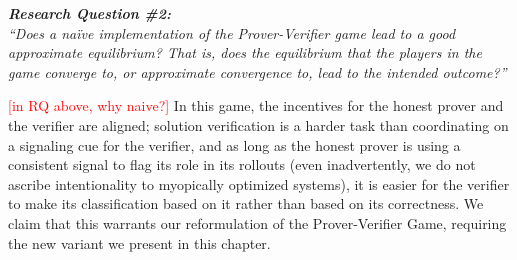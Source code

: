 \newpage
\begin{tcolorbox}[
    colback=gray!10,
    colframe=black,
    boxrule=0.5pt,
    arc=3mm,
    left=10pt,
    right=10pt,
    top=8pt,
    bottom=8pt
]
\centering
\textit{\textbf{\normalsize Research Question \#2:}} \\[0.3em]
\textit{``Does a naïve implementation of the Prover-Verifier game lead to a good approximate equilibrium? That is, does the equilibrium that the players in the game converge to, or approximate convergence to, lead to the intended outcome?''}
\end{tcolorbox}\noindent
\textcolor{red}{[in RQ above, why naive?]}
In this game, the incentives for the honest prover and the verifier are aligned; solution verification is a harder task than coordinating on a signaling cue for the verifier, and as long as the honest prover is using a consistent signal to flag its role in its rollouts (even inadvertently, we do not ascribe intentionality to myopically optimized systems), it is easier for the verifier to make its classification based on it rather than based on its correctness. We claim that this warrants our reformulation of the Prover-Verifier Game, requiring the new variant we present in this chapter. 